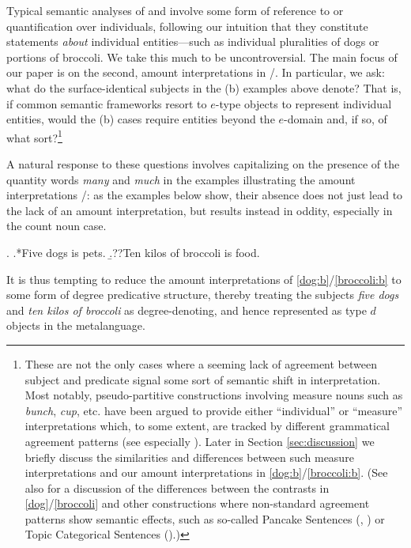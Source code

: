 \documentclass[a4paper,12pt,twoside]{article}
\begin{document}
	Typical semantic analyses of \LLast[a] and \Last[a] involve some form of reference to or quantification over individuals, following our intuition that they constitute statements \textit{about} individual entities---such as individual pluralities of dogs or  portions of broccoli. We take this much to be uncontroversial. The main focus of our paper is on the second, amount interpretations in \LLast[b]/\Last[b]. In particular, we ask: what do the surface-identical subjects in the (b) examples above denote? That is, if common semantic frameworks resort to $e$-type objects to represent individual entities, would the (b) cases require entities beyond the $e$-domain and, if so, of what sort?\footnote{
		These are not the only cases where a seeming lack of agreement between subject and predicate signal some sort of semantic shift in interpretation. Most notably, pseudo-partitive constructions involving measure nouns such as \textit{bunch}, \textit{cup}, etc. have been argued to provide either ``individual'' or ``measure'' interpretations which, to some extent, are tracked by different grammatical agreement patterns (see especially \citealt{Rothstein:2009,Rothstein:2016,Rothstein:2017}). Later in Section \ref{sec:discussion} we briefly discuss the similarities and differences between such measure interpretations and our amount interpretations in \ref{dog:b}/\ref{broccoli:b}. (See also \citet{Mendia&Espinal:2024b} for a discussion of the differences between the contrasts in \ref{dog}/\ref{broccoli} and other constructions where non-standard agreement patterns show semantic effects, such as so-called Pancake Sentences (\citealt{Enger:2004}, \citealt{Wechsler:2011}) or Topic Categorical Sentences (\citealt{Britto:2000}).)
	} 
	
	A natural response to these questions involves capitalizing on the presence of the quantity words \textit{many} and \textit{much} in the examples illustrating the amount interpretations  \LLast[b]/\Last[b]: as the examples below show, their absence does not just lead to the lack of an amount interpretation, but results instead in oddity, especially in the count noun case.
	
	\ex.
	\a.*\label{with_many}Five dogs is pets.
	\b.??\label{with_much}Ten kilos of broccoli is food.	
	
	It is thus tempting  to reduce the amount interpretations of \ref{dog:b}/\ref{broccoli:b} to some form of  degree predicative structure, thereby treating the subjects \textit{five dogs} and \textit{ten kilos of broccoli} as degree-denoting, and hence represented as type $d$ objects in the metalanguage.%
	
\end{document}
